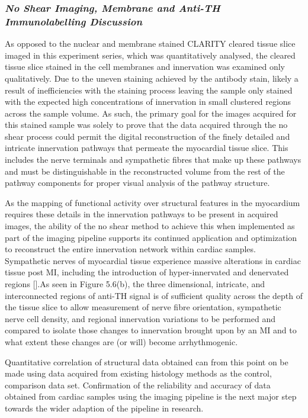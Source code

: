 \subsubsection{\textit{No Shear Imaging, Membrane and Anti-TH Immunolabelling Discussion}}
As opposed to the nuclear and membrane stained CLARITY cleared tissue slice imaged in this experiment series, which was quantitatively analysed, the cleared tissue slice stained in the cell membranes and innervation was examined only qualitatively. Due to the uneven staining achieved by the antibody stain, likely a result of inefficiencies with the staining process leaving the sample only stained with the expected high concentrations  of innervation in small clustered regions across the sample volume. As such, the primary goal for the images acquired for this stained sample was solely to prove that the data acquired through the no shear process could permit the digital reconstruction of the finely detailed and intricate innervation pathways that permeate the myocardial tissue slice. This includes the nerve terminals and sympathetic fibres that make up these pathways and must be distinguishable in the reconstructed volume from the rest of the pathway components for proper visual analysis of the pathway structure. 

As the mapping of functional activity over structural features in the myocardium requires these details in the innervation pathways to be present in acquired images, the ability of the no shear method to achieve this when implemented as part of the imaging pipeline supports its continued application and optimization to reconstruct the entire innervation network within cardiac samples. Sympathetic nerves of myocardial tissue experience massive alterations in cardiac tissue post MI, including the introduction of hyper-innervated and denervated regions [].As seen in Figure 5.6(b), the three dimensional, intricate, and interconnected regions of anti-TH signal is of sufficient quality across the depth of the tissue slice to allow measurement of nerve fibre orientation, sympathetic nerve cell density, and regional innervation variations to be performed and compared to isolate those changes to innervation brought upon by an MI and to what extent these changes are (or will) become arrhythmogenic. 

Quantitative correlation of structural data obtained can from this point on be made using data acquired from existing histology methods as the control, comparison data set. Confirmation of the reliability and accuracy of data obtained from cardiac samples using the imaging pipeline is the next major step towards the wider adaption of the pipeline in research.



